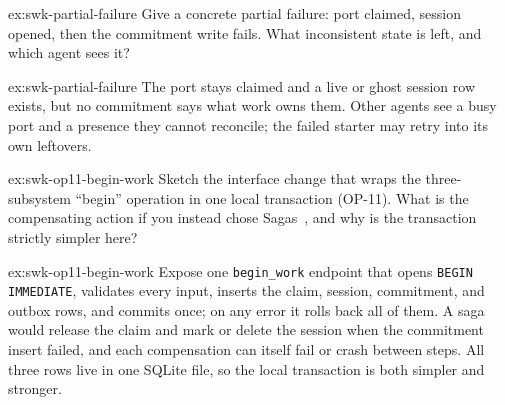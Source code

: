 \documentclass[11pt,a4paper]{article}
\theoremstyle{definition}
\theoremstyle{remark}
\begin{document}

\begin{pdexercise}[kind=Check,rating=1]{ex:swk-partial-failure}
Give a concrete partial failure: port claimed, session opened, then the commitment write fails. What inconsistent state is left, and which agent sees it?
\end{pdexercise}
\begin{pdsolution}{ex:swk-partial-failure}
The port stays claimed and a live or ghost session row exists, but no commitment says what work owns them. Other agents see a busy port and a presence they cannot reconcile; the failed starter may retry into its own leftovers.
\end{pdsolution}
\begin{pdexercise}[kind=Open,rating=3]{ex:swk-op11-begin-work}
Sketch the interface change that wraps the three-subsystem ``begin'' operation in one local transaction (OP-11). What is the compensating action if you instead chose Sagas~, and why is the transaction strictly simpler here?
\end{pdexercise}
\begin{pdsolution}{ex:swk-op11-begin-work}
Expose one \texttt{begin\_work} endpoint that opens \texttt{BEGIN IMMEDIATE}, validates every input, inserts the claim, session, commitment, and outbox rows, and commits once; on any error it rolls back all of them. A saga would release the claim and mark or delete the session when the commitment insert failed, and each compensation can itself fail or crash between steps. All three rows live in one SQLite file, so the local transaction is both simpler and stronger.
\end{pdsolution}

\end{document}

